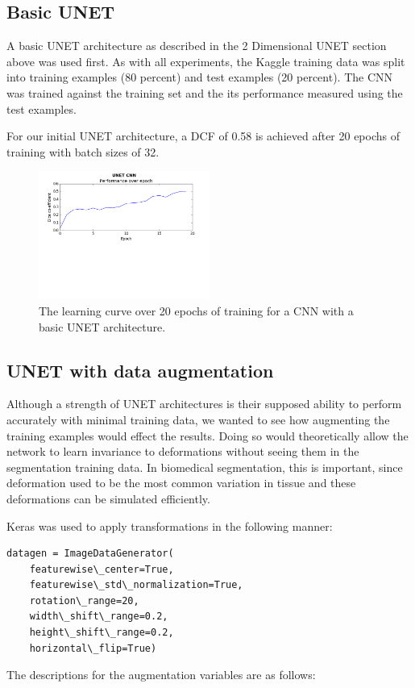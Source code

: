 \documentclass[letterpaper]{article}
\begin{document}
\subsection{Basic UNET}
A basic UNET architecture as described in the 2 Dimensional UNET section above was used first. As with all experiments, the Kaggle training data was split into training examples (80 percent) and test examples (20 percent).  The CNN was trained against the training set and the its performance measured using the test examples. 

For our initial UNET architecture, a DCF of 0.58 is achieved after 20 epochs of training with batch sizes of 32. 

 \begin{figure}[H]
  \centerline{\includegraphics[width=0.5\textwidth]{Plots/UNETSimple20.png}}
  \caption{The learning curve over 20 epochs of training for a CNN with a basic UNET architecture.}
  \label{fig:unet3}
\end{figure}

\subsection{UNET with data augmentation}

Although a strength of UNET architectures is their supposed ability to perform accurately with minimal training data, we wanted to see how augmenting the training examples would effect the results. Doing so would theoretically allow the network to learn invariance to deformations without seeing them in the segmentation training data. In biomedical segmentation, this is important, since deformation used to be the most common variation in tissue and these deformations can be simulated efficiently. 

Keras was used to apply transformations in the following manner:

\begin{lstlisting}
datagen = ImageDataGenerator(
    featurewise\_center=True,
    featurewise\_std\_normalization=True,
    rotation\_range=20,
    width\_shift\_range=0.2,
    height\_shift\_range=0.2,
    horizontal\_flip=True)
\end{lstlisting}
The descriptions for the augmentation variables are as follows:
\end{document}
